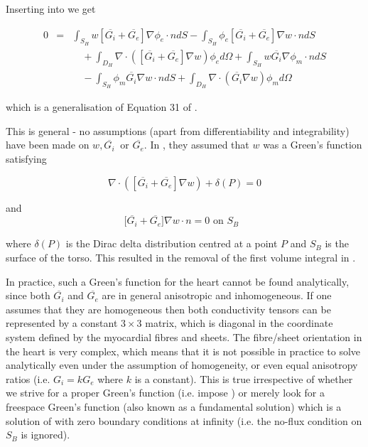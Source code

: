 Inserting  into  we get

\begin{eqnarray}
        0 &=&\int_{S_{H}}w[\overline{G_{i}}+\overline{G_{e}}]\nabla \phi _{e}\cdot ndS
                -\int_{S_{H}}\phi _{e}[\overline{G_{i}}+\overline{G_{e}}]\nabla w\cdot ndS 
                          \nonumber \\
                && \quad
                        + \int_{D_{H}}\nabla \cdot ([\overline{G_{i}}+\overline{G_{e}}]\nabla w)
                        \phi_{e}d\Omega +\int_{S_{H}}w\overline{G_{i}}\nabla \phi _{m}\cdot ndS 
                        \nonumber \\
                && \quad 
                        - \int_{S_{H}}\phi _{m}\overline{G_{i}}\nabla w\cdot ndS+\int_{D_{H}}\nabla
                        \cdot (\overline{G_{i}}\nabla w)\phi _{m}d\Omega   
        \label{BIE eqtn}
\end{eqnarray}

which is a generalisation of Equation 31 of \cite{yamashita:1985}.

This  is general - no assumptions (apart from
differentiability and integrability) have been made on $w,\overline{G_{i}}\ $%
or $\overline{G_{e}}$. In \cite{yamashita:1985}, they
assumed that $w$ was a Green's function satisfying

\begin{equation}
\nabla \cdot ([\overline{G_{i}}+\overline{G_{e}}]\nabla w)+\delta (P)=0
\label{Greens_fn}
\end{equation}

and 
\begin{equation}
\lbrack \overline{G_{i}}+\overline{G_{e}}]\nabla w\cdot n=0\text{ on }S_{B}
\text{ }  \label{no_flux}
\end{equation}

where $\delta (P)$ is the Dirac delta distribution centred at a point $P$ and
$S_{B}$ is the surface of the torso.  This resulted in the removal of the
first volume integral in .

In practice, such a Green's function for the heart cannot be found
analytically, since both $\overline{G_{i}}$ and $\overline{G_{e}}$ 
are in general anisotropic and inhomogeneous.
If one assumes that they are homogeneous then both conductivity tensors can be
represented by a constant $3\times 3$ matrix, which is diagonal in the coordinate
system defined by the myocardial fibres and sheets. The fibre/sheet orientation in
the heart is very complex, which means that it is not possible in practice to solve
 analytically even under the assumption of homogeneity, or
even equal anisotropy ratios (i.e. $G_{i}=kG_{e}$ where $k$ is a constant).
This is true irrespective of whether we strive for a proper Green's function
(i.e. impose ) or merely look for a freespace Green's
function (also known as a fundamental solution) which is a solution of
 with zero boundary conditions at infinity (i.e. the no-flux
condition on $S_{B}$ is ignored).

